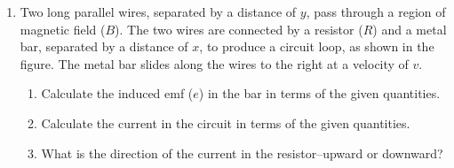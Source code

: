 \documentclass{../../../oss-classkick}
\begin{document}
\begin{enumerate}[leftmargin=15pt]
  \begin{center}
  \end{center}
\item Two long parallel wires, separated by a distance of $y$, pass through a
  region of magnetic field ($B$). The two wires are connected by a resistor
  ($R$) and a metal bar, separated by a distance of $x$, to produce a circuit
  loop, as shown in the figure. The metal bar slides along the wires to
  the right at a velocity of $v$.
   \begin{enumerate}
   \item Calculate the induced emf ($e$) in the bar in terms of the given
     quantities.
   \item Calculate the current in the circuit in terms of the given quantities.
   \item What is the direction of the current in the resistor--upward or
     downward?
   \end{enumerate}
\end{enumerate}
\end{document}
